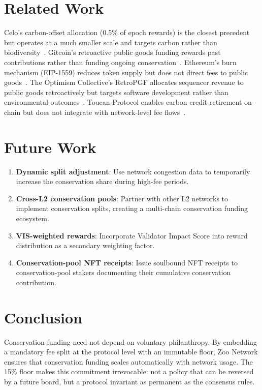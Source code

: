 \documentclass[11pt,letterpaper]{article}
\begin{document}
\section{Related Work}

Celo's carbon-offset allocation (0.5\% of epoch rewards) is the closest precedent but operates at a much smaller scale and targets carbon rather than biodiversity~\cite{celo2021}. Gitcoin's retroactive public goods funding rewards past contributions rather than funding ongoing conservation~\cite{gitcoin2023}. Ethereum's burn mechanism (EIP-1559) reduces token supply but does not direct fees to public goods~\cite{eip1559}. The Optimism Collective's RetroPGF allocates sequencer revenue to public goods retroactively but targets software development rather than environmental outcomes~\cite{optimism2023}. Toucan Protocol enables carbon credit retirement on-chain but does not integrate with network-level fee flows~\cite{toucan2022}.

\section{Future Work}

\begin{enumerate}
    \item \textbf{Dynamic split adjustment}: Use network congestion data to temporarily increase the conservation share during high-fee periods.
    \item \textbf{Cross-L2 conservation pools}: Partner with other L2 networks to implement conservation splits, creating a multi-chain conservation funding ecosystem.
    \item \textbf{VIS-weighted rewards}: Incorporate Validator Impact Score into reward distribution as a secondary weighting factor.
    \item \textbf{Conservation-pool NFT receipts}: Issue soulbound NFT receipts to conservation-pool stakers documenting their cumulative conservation contribution.
\end{enumerate}

\section{Conclusion}

Conservation funding need not depend on voluntary philanthropy. By embedding a mandatory fee split at the protocol level with an immutable floor, Zoo Network ensures that conservation funding scales automatically with network usage. The 15\% floor makes this commitment irrevocable: not a policy that can be reversed by a future board, but a protocol invariant as permanent as the consensus rules.
\end{document}
